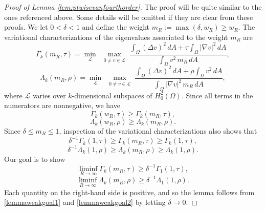 \documentclass[11pt]{amsart}
\theoremstyle{definition}
\numberwithin{equation}{section}
\begin{document}
\begin{proof}[Proof of Lemma \ref{lem:ptwisevanfourthorder}]
The proof will be quite similar to the ones referenced above. Some details will be omitted if they are clear from these proofs. We let $0 < \delta < 1$ and define the weight $m_R := \max(\delta, w_R) \geq w_R$. The variational characterizations of the eigenvalues associated to the weight $m_R$ are
\begin{equation*}
\Gamma_k(m_R, \tau)
= \min_{\mathcal L}\ \max_{\substack{0\neq v\in\mathcal L}}
\frac{\displaystyle \int_{\Omega}(\Delta v)^2\,dA + \tau \int_{\Omega}|\nabla v|^2\,dA}{\displaystyle \int_{\Omega} v^2\,m_R\,dA},
\end{equation*}
\begin{equation*}
\Lambda_k(m_R, \rho)
= \min_{\mathcal L}\ \max_{\substack{0\neq v\in\mathcal L}}
\frac{\displaystyle \int_{\Omega}(\Delta v)^2\,dA + \rho \int_{\Omega}v^2\,dA}{\displaystyle \int_{\Omega} |\nabla v|^2\,m_R\,dA},
\end{equation*}
where $\mathcal{L}$ varies over $k$-dimensional subspaces of $H_0^2(\Omega)$. Since all terms in the numerators are nonnegative, we have
$$
\Gamma_k(w_R,\tau) \geq \Gamma_k(m_R,\tau),
$$
$$
\Lambda_k(w_R,\rho) \geq \Lambda_k(m_R,\rho).
$$
Since $\delta \le m_R \le 1$, inspection of the variational characterizations also shows that
\begin{equation}\label{lemmaweak1}
\delta^{-1}\Gamma_k(1, \tau) \geq \Gamma_k(m_R, \tau) \geq \Gamma_k(1, \tau),
\end{equation}
\begin{equation}\label{lemmaweak2}
\delta^{-1}\Lambda_k(1, \rho) \geq \Lambda_k(m_R, \rho) \geq \Lambda_k(1, \rho).
\end{equation}
Our goal is to show
\begin{equation}\label{lemmaweakgoal1}
\liminf_{R \to \infty} \Gamma_k(m_R,\tau)\geq \delta^{-1}\Gamma_1(1,\tau),
\end{equation}
\begin{equation}\label{lemmaweakgoal2}
\liminf_{R \to \infty} \Lambda_k(m_R,\rho)\geq \delta^{-1}\Lambda_1(1,\rho).
\end{equation}
Each quantity on the right-hand side is positive, and so the lemma follows from \eqref{lemmaweakgoal1} and \eqref{lemmaweakgoal2} by letting $\delta\to 0$.


\end{proof}
\end{document}
